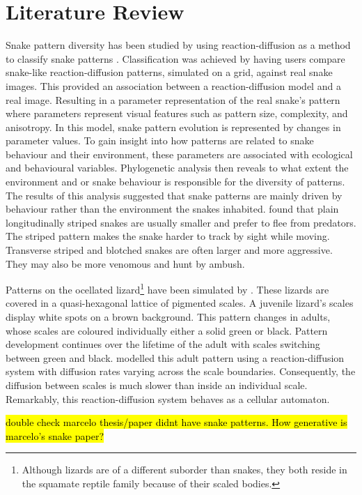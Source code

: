 \section{Literature Review}
Snake pattern diversity has been studied by using reaction-diffusion as a method to classify snake patterns \citep{Allen2013}. Classification was achieved by having users compare snake-like reaction-diffusion patterns, simulated on a grid, against real snake images. This provided an association between a reaction-diffusion model and a real image. Resulting in a parameter representation of the real snake’s pattern where parameters represent visual features such as pattern size, complexity, and anisotropy. In this model, snake pattern evolution is represented by changes in parameter values. To gain insight into how patterns are related to snake behaviour and their environment, these parameters are associated with ecological and behavioural variables. Phylogenetic analysis then reveals to what extent the environment and or  snake behaviour is responsible for the diversity of patterns. The results of this analysis suggested that snake patterns are mainly driven by behaviour rather than the environment the snakes inhabited. \citet{Allen2013} found that plain longitudinally striped snakes are usually smaller and prefer to flee from predators. The striped pattern makes the snake harder to track by sight while moving. Transverse striped and blotched snakes are often larger and more aggressive. They may also be more venomous and hunt by ambush.

Patterns on the ocellated lizard\footnote{Although lizards are of a different suborder than snakes, they both reside in the squamate reptile family because of their scaled bodies.} have been simulated by \citet{manukyan2017}. These lizards are covered in a quasi-hexagonal lattice of pigmented scales. A juvenile lizard's scales display white spots on a brown background. This pattern changes in adults, whose scales are coloured individually either a solid green or black. Pattern development continues over the lifetime of the adult with scales switching between green and black. \citet{manukyan2017} modelled this adult pattern using a reaction-diffusion system with diffusion rates varying across the scale boundaries. Consequently, the diffusion between scales is much slower than inside an individual scale. Remarkably, this reaction-diffusion system behaves as a cellular automaton.

\hl{double check marcelo thesis/paper didnt have snake patterns. How generative is marcelo's snake paper?}

